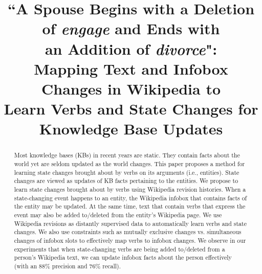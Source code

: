 \documentclass[11pt,a4paper]{article}
\title{``A Spouse Begins with a Deletion of \textit{engage} and Ends with \\an Addition of \textit{divorce}": \\Mapping Text and Infobox Changes in Wikipedia to \\Learn Verbs and State Changes for Knowledge Base Updates}
\author{%
  }
\date{}
\begin{document}
\maketitle


\begin{abstract}
Most knowledge bases (KBs) %
in recent years are static. They contain facts about the world yet are seldom updated as the world changes. This paper proposes a method for learning state changes brought about by verbs on its arguments (i.e., entities). State changes are viewed as updates of KB facts pertaining to the entities. We propose to learn state changes brought about by verbs using Wikipedia revision histories. When a state-changing event happens to an entity, the Wikipedia infobox that contains facts of the entity may be updated. At the same time, text that contain verbs that express the event may also be added to/deleted from the entity's Wikipedia page. We use Wikipedia revisions %
as distantly supervised data to automatically learn verbs and state changes. We also use %
constraints such as mutually exclusive changes vs. simultaneous changes of infobox slots to effectively map verbs to infobox changes. We observe in our experiments that when state-changing verbs are being added to/deleted from a person's Wikipedia text, we can update infobox facts about the person effectively (with an 88\% precision and 76\% recall). 

\end{abstract}








\end{document}
